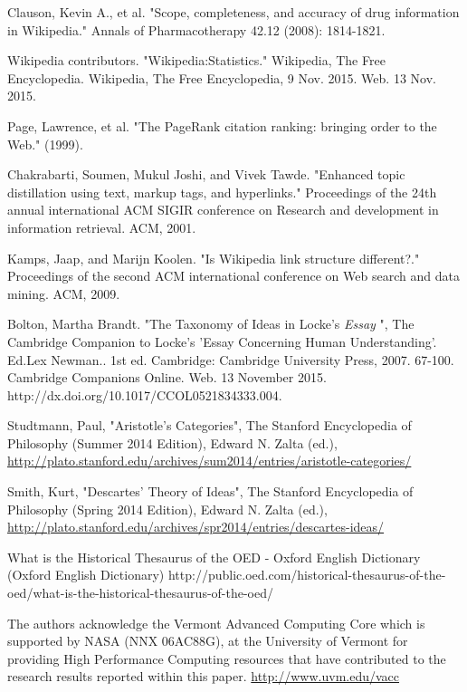 \documentclass[pre,twocolumn,twoside,superscriptaddress,floatfix, aps, 10pt]{revtex4-1}
\begin{document}
\begin{thebibliography}{1}
       Clauson, Kevin A., et al. "Scope, completeness, and accuracy of drug information in Wikipedia." Annals of Pharmacotherapy 42.12 (2008): 1814-1821.

       Wikipedia contributors. "Wikipedia:Statistics." Wikipedia, The Free Encyclopedia. Wikipedia, The Free Encyclopedia, 9 Nov. 2015. Web. 13 Nov. 2015.

       Page, Lawrence, et al. "The PageRank citation ranking: bringing order to the Web." (1999).

       Chakrabarti, Soumen, Mukul Joshi, and Vivek Tawde. "Enhanced topic distillation using text, markup tags, and hyperlinks." Proceedings of the 24th annual international ACM SIGIR conference on Research and development in information retrieval. ACM, 2001.

       Kamps, Jaap, and Marijn Koolen. "Is Wikipedia link structure different?." Proceedings of the second ACM international conference on Web search and data mining. ACM, 2009.

     Bolton, Martha Brandt. "The Taxonomy of Ideas in Locke’s {\it Essay} ", The Cambridge Companion to Locke's 'Essay Concerning Human Understanding'. Ed.Lex Newman.. 1st ed. Cambridge: Cambridge University Press, 2007. 67-100. Cambridge Companions Online. Web. 13 November 2015. http://dx.doi.org/10.1017/CCOL0521834333.004.

     Studtmann, Paul, "Aristotle's Categories", The Stanford Encyclopedia of Philosophy (Summer 2014 Edition), Edward N. Zalta (ed.), \url{http://plato.stanford.edu/archives/sum2014/entries/aristotle-categories/}

     Smith, Kurt, "Descartes' Theory of Ideas", The Stanford Encyclopedia of Philosophy (Spring 2014 Edition), Edward N. Zalta (ed.), \url{http://plato.stanford.edu/archives/spr2014/entries/descartes-ideas/}


     What is the Historical Thesaurus of the OED - Oxford English Dictionary (Oxford English Dictionary)
    http://public.oed.com/historical-thesaurus-of-the-oed/what-is-the-historical-thesaurus-of-the-oed/

     The authors acknowledge the Vermont Advanced Computing Core which is supported by NASA (NNX 06AC88G), at the University of Vermont for providing High Performance Computing resources that have contributed to the research results reported within this paper.
    \url{http://www.uvm.edu/vacc}


\end{thebibliography}
\end{document}
